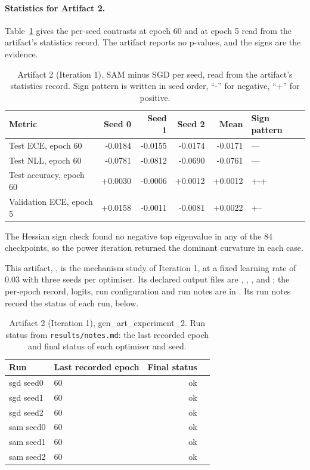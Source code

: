 \documentclass[11pt,letterpaper]{article}
\begin{document}
\paragraph{Statistics for Artifact 2.} Table~\ref{tab:stats2} gives the per-seed contrasts at epoch 60 and at epoch 5 read from the artifact's statistics record. The artifact reports no p-values, and the signs are the evidence.

\begin{table}[!htbp]
\centering
\footnotesize
\caption{Artifact 2 (Iteration 1). SAM minus SGD per seed, read from the artifact's statistics record. Sign pattern is written in seed order, ``-'' for negative, ``+'' for positive.}
\label{tab:stats2}
\begin{tabular}{lrrrrl}
\toprule
Metric & Seed 0 & Seed 1 & Seed 2 & Mean & Sign pattern \\
\midrule
Test ECE, epoch 60 & -0.0184 & -0.0155 & -0.0174 & -0.0171 & --- \\
Test NLL, epoch 60 & -0.0781 & -0.0812 & -0.0690 & -0.0761 & --- \\
Test accuracy, epoch 60 & +0.0030 & -0.0006 & +0.0012 & +0.0012 & +-+ \\
Validation ECE, epoch 5 & +0.0158 & -0.0011 & -0.0081 & +0.0022 & +-- \\
\bottomrule
\end{tabular}
\end{table}

The Hessian sign check found no negative top eigenvalue in any of the 84 checkpoints, so the power iteration returned the dominant curvature in each case.


This artifact, , is the mechanism study of Iteration 1, at a fixed learning rate of 0.03 with three seeds per optimiser. Its declared output files are , , ,  and ; the per-epoch record, logits, run configuration and run notes are in . Its run notes record the status of each run, below.

\begin{table}[!htbp]
\centering
\footnotesize
\caption{Artifact 2 (Iteration 1), gen\_art\_experiment\_2. Run status from \texttt{results/notes.md}: the last recorded epoch and final status of each optimiser and seed.}
\label{tab:runs2}
\begin{tabular}{llrl}
\toprule
Run & Last recorded epoch & Final status \\
\midrule
sgd seed0 & 60 & ok \\
sgd seed1 & 60 & ok \\
sgd seed2 & 60 & ok \\
sam seed0 & 60 & ok \\
sam seed1 & 60 & ok \\
sam seed2 & 60 & ok \\
\bottomrule
\end{tabular}
\end{table}
\end{document}
